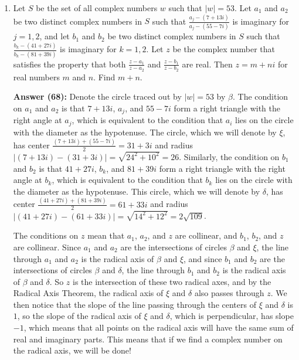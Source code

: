 \documentclass{article}
\begin{document}
\begin{enumerate}
\newpage

\item Let $S$ be the set of all complex numbers $w$ such that $|w|=53$. Let $a_1$ and $a_2$ be two distinct complex numbers in $S$ such that $ \displaystyle \frac{a_j-(7+13i)}{a_j-(55-7i)} $ is imaginary for $j=1,2$, and let $b_1$ and $b_2$ be two distinct complex numbers in $S$ such that $ \displaystyle \frac{b_k-(41+27i)}{b_k-(81+39i)} $  is imaginary for $k=1,2$. Let $z$ be the complex number that satisfies the property that both $\displaystyle \frac{z-a_1}{z-a_2}$ and $\displaystyle \frac{z-b_1}{z-b_2}$ are real. Then $z=m+ni$ for real numbers $m$ and $n$. Find $m+n$.

\textbf{Answer (68):} Denote the circle traced out by $|w| = 53$ by $\beta$. The condition on $a_1$ and $a_2$ is that $7+13i$, $a_j$, and $55-7i$ form a right triangle with the right angle at $a_j$, which is equivalent to the condition that $a_i$ lies on the circle with the diameter as the hypotenuse. The circle, which we will denote by $\xi$, has center $\frac{(7+13i)+(55-7i)}{2} = 31+3i$ and radius $|(7+13i)-(31+3i)| = \sqrt{24^2+10^2} = 26$. Similarly, the condition on $b_1$ and $b_2$ is that $41+27i$, $b_k$, and $81+39i$ form a right triangle with the right angle at $b_k$, which is equivalent to the condition that $b_k$ lies on the circle with the diameter as the hypotenuse. This circle, which we will denote by $\delta$, has center $\frac{(41+27i)+(81+39i)}{2} = 61+33i$ and radius $|(41+27i)-(61+33i)| = \sqrt{14^2+12^2} = 2\sqrt{109}$.

The conditions on $z$ mean that $a_1$, $a_2$, and $z$ are collinear, and $b_1$, $b_2$, and $z$ are collinear. Since $a_1$ and $a_2$ are the intersections of circles $\beta$ and $\xi$, the line through $a_1$ and $a_2$ is the radical axis of $\beta$ and $\xi$, and since $b_1$ and $b_2$ are the intersections of circles $\beta$ and $\delta$, the line through $b_1$ and $b_2$ is the radical axis of $\beta$ and $\delta$. So $z$ is the intersection of these two radical axes, and by the Radical Axis Theorem, the radical axis of $\xi$ and $\delta$ also passes through $z$. We then notice that the slope of the line passing through the centers of $\xi$ and $\delta$ is $1$, so the slope of the radical axis of $\xi$ and $\delta$, which is perpendicular, has slope $-1$, which means that all points on the radical axis will have the same sum of real and imaginary parts. This means that if we find a complex number on the radical axis, we will be done!


\end{enumerate}
\end{document}
